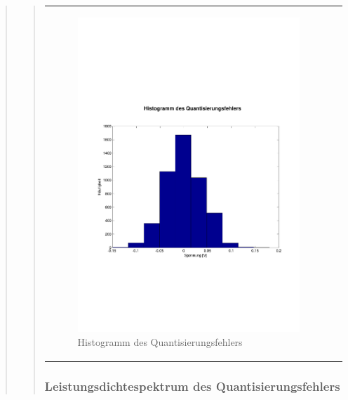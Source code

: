 \begin{quote}
\begin{quote}
\begin{center}
\begin{tabular}{ll}
                \begin{minipage}{0.6\textwidth}
                    \begin{figure}[H]
                        \includegraphics[scale=0.55, trim = 1.6cm 9cm 1.6cm
                        8.5cm, clip]
                        {./Bilder/drei100_Histogramm}
                          \caption{Histogramm des Quantisierungsfehlers}
                    \end{figure}
                \end{minipage}
            
            \end{tabular}
        \end{center}
        
        
        \subsubsection{Leistungsdichtespektrum des Quantisierungsfehlers}
		\begin{quote}
		

\end{quote}
\end{quote}
\end{quote}
